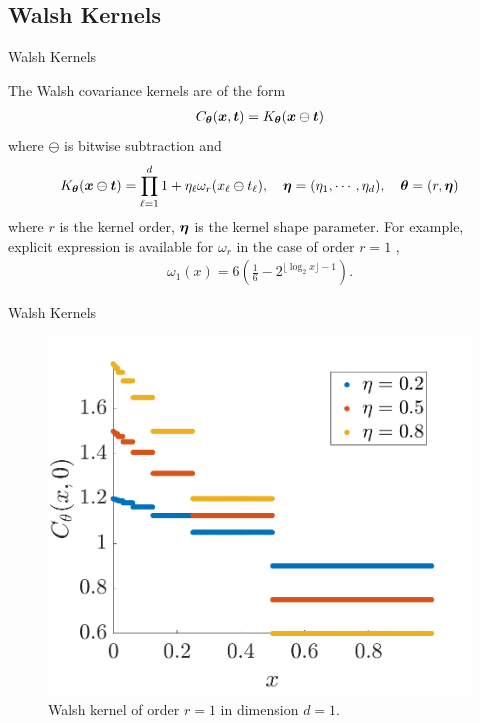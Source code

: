 \documentclass[handout, 10pt,compress,xcolor={usenames,dvipsnames}]{beamer} %
\newcommand{\bm}[1]{\boldsymbol{#1}}
\renewcommand{\vtheta}{{\bm{\theta}}}
\begin{document}
\subsection{Walsh Kernels}

\begin{frame}{Walsh Kernels}

The Walsh covariance kernels are of the form
\begin{align}
\label{eqn:digital_shift_in_kernel}
C_{\vtheta}(\vx, \vt) = K_{\vtheta} (\vx \ominus \vt)
\end{align}
where $\ominus$ is bitwise subtraction and 
\begin{align}
\label{eqn:walsh_kernel}
K_{\vtheta} (\vx \ominus \vt) =  
\prod_{\ell=1}^d  1 + \eta_\ell \omega_{r} (x_\ell \ominus t_\ell), \quad \veta = (\eta_1, \cdots, \eta_d), \quad \vtheta = (r, \veta)
\end{align}
where $r$ is the kernel order, $\boldsymbol{\eta}$ is the kernel shape parameter.
For example, explicit expression is available for $\omega_{r}$ in the case of order $r=1$ \cite{Nuyens2013}, %
\begin{align}
\label{eqn:omega1}
\omega_1(x) 
= 6\left( \frac 16 - 2^{\lfloor \log_2 x \rfloor -1 }\right).
\end{align}
\end{frame}


\begin{frame}{Walsh Kernels}
	\vspace{-6ex}
\begin{figure}
	\centering
	\includegraphics[width=0.7\linewidth]{"../figures/walsh_kernel dim_1"}
	\caption[Walsh kernel]{Walsh kernel of order $r=1$ in dimension $d=1$. } 
	\label{fig:walshkernel-dim1}
\end{figure}
\end{frame}
\end{document}
